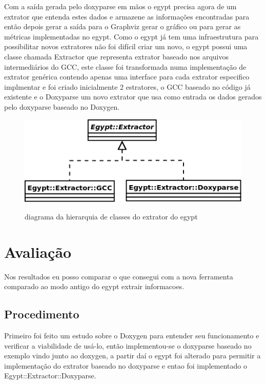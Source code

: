 Com a saída gerada pelo doxyparse em mãos o egypt precisa agora de um extrator que entenda estes dados e armazene as informações encontradas para então depois gerar a saída para o Graphviz gerar o gráfico ou para gerar as métricas implementadas no egypt. Como o egypt já tem uma infraestrutura para possibilitar novos extratores não foi difícil criar um novo, o egypt possui uma classe chamada Extractor que representa extrator baseado nos arquivos intermediários do GCC, este classe foi transformada numa implementação de extrator genérica contendo apenas uma interface para cada extrator especifico implmentar e foi criado inicialmente 2 estratores, o GCC baseado no código já existente e o Doxyparse um novo extrator que usa como entrada os dados gerados pelo doxyparse baseado no Doxygen.

\begin{figure}[h]
\center
\includegraphics[scale=0.5]{imagens/egypt-diagram-extractor}
\label{egypt-diagram-extractor}
\caption{diagrama da hierarquia de classes do extrator do egypt}
\end{figure}

\chapter{Avaliação}

Nos resultados eu posso comparar o que consegui com a nova ferramenta comparado ao modo antigo do egypt extrair informacoes.

\section{Procedimento}

Primeiro foi feito um estudo sobre o Doxygen para entender seu funcionamento e verificar a viabilidade de usá-lo, então implementou-se o doxyparse baseado no exemplo vindo junto ao doxygen, a partir daí o egypt foi alterado para permitir a implementação do extrator baseado no doxyparse e entao foi implementado o Egypt::Extractor::Doxyparse.

